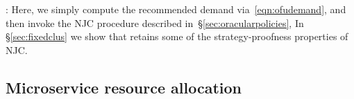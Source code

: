 :
Here, we simply compute the recommended demand via~\eqref{eqn:ofudemand}, and then invoke the
NJC procedure described in~\S\ref{sec:oracularpolicies},
In \S\ref{sec:fixedclus} we show that \cilantronjc{} retains some of the
strategy-proofness properties of NJC.







\subsection{Microservice resource allocation}
\label{sec:msal}


